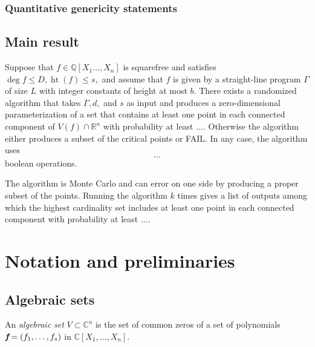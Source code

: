 \documentclass[sigconf]{acmart}
\DeclareMathOperator{\htt}{ht}
\def\C{\mathbb{C}}
\def\Q{\mathbb{Q}}
\def\R{\mathbb{R}}
\begin{document}
\subsubsection{Quantitative genericity statements}
%
\subsection{Main result}
%
\begin{theorem}
Suppose that $f\in\Q[X_1\hdots,X_n]$ is squarefree and satisfies $\deg f \leq D, \htt(f) \leq s,$ and assume that $f$ is given by a straight-line program $\Gamma$ of size $L$ with integer constants of height at most $b.$ There exists a randomized algorithm that takes $\Gamma, d,$ and $s$ as input and produces a zero-dimensional parameterization of a set that contains at least one point in each connected component of $V(f) \cap \R^n$ with probability at least $\hdots$. Otherwise the algorithm either produces a subset of the critical points or FAIL. In any case, the algorithm uses 
\[
\hdots  
\]
boolean operations.
\end{theorem}
%
The algorithm is Monte Carlo and can error on one side by producing a proper subset of the points. Running the algorithm $k$ times gives a list of outputs among which the highest cardinality set includes at least one point in each connected component with probability at least $\hdots.$
%
%
%
%
\section{Notation and preliminaries}
%
\subsection{Algebraic sets}
%
An \textit{algebraic set} $V \subset \C^n$ is the set of common zeros of a set of polynomials $\textit{\textbf{f}}=(f_1,\hdots,f_s)$ in $\C[X_1,\hdots,X_n].$
\end{document}
